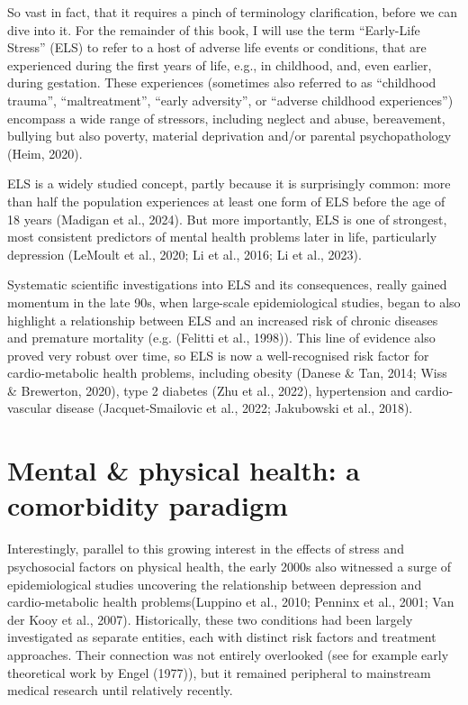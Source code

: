 \documentclass[
  letterpaper,
  DIV=11,
  numbers=noendperiod]{scrreport}
\begin{document}
So vast in fact, that it requires a pinch of terminology clarification,
before we can dive into it. For the remainder of this book, I will use
the term ``Early-Life Stress'' (ELS) to refer to a host of adverse life
events or conditions, that are experienced during the first years of
life, e.g., in childhood, and, even earlier, during gestation. These
experiences (sometimes also referred to as ``childhood trauma'',
``maltreatment'', ``early adversity'', or ``adverse childhood
experiences'') encompass a wide range of stressors, including neglect
and abuse, bereavement, bullying but also poverty, material deprivation
and/or parental psychopathology (Heim, 2020).

ELS is a widely studied concept, partly because it is surprisingly
common: more than half the population experiences at least one form of
ELS before the age of 18 years (Madigan et al., 2024). But more
importantly, ELS is one of strongest, most consistent predictors of
mental health problems later in life, particularly depression (LeMoult
et al., 2020; Li et al., 2016; Li et al., 2023).

Systematic scientific investigations into ELS and its consequences,
really gained momentum in the late 90s, when large-scale epidemiological
studies, began to also highlight a relationship between ELS and an
increased risk of chronic diseases and premature mortality (e.g.
(Felitti et al., 1998)). This line of evidence also proved very robust
over time, so ELS is now a well-recognised risk factor for
cardio-metabolic health problems, including obesity (Danese \& Tan,
2014; Wiss \& Brewerton, 2020), type 2 diabetes (Zhu et al., 2022),
hypertension and cardio-vascular disease (Jacquet-Smailovic et al.,
2022; Jakubowski et al., 2018).

\section{Mental \& physical health: a comorbidity
paradigm}\label{mental-physical-health-a-comorbidity-paradigm}

Interestingly, parallel to this growing interest in the effects of
stress and psychosocial factors on physical health, the early 2000s also
witnessed a surge of epidemiological studies uncovering the relationship
between depression and cardio-metabolic health problems(Luppino et al.,
2010; Penninx et al., 2001; Van der Kooy et al., 2007). Historically,
these two conditions had been largely investigated as separate entities,
each with distinct risk factors and treatment approaches. Their
connection was not entirely overlooked (see for example early
theoretical work by Engel (1977)), but it remained peripheral to
mainstream medical research until relatively recently.
\end{document}
